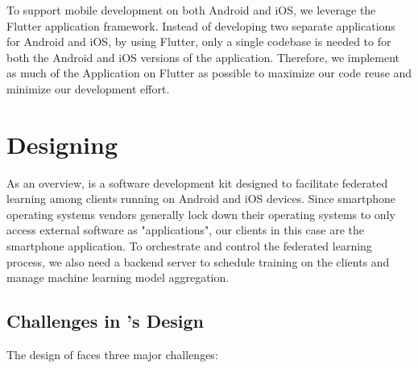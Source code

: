To support mobile development on both Android and iOS,
we leverage the Flutter application framework.
Instead of developing two separate applications for Android and iOS,
by using Flutter,
only a single codebase is needed to for both the Android and iOS versions of
the application.
Therefore, we implement as much of the \fedcampus Application on Flutter as
possible to maximize our code reuse and minimize our development effort.

\section{Designing \fedkit}

As an overview, \fedkit is a software development kit designed to
facilitate federated learning among clients running on Android and iOS devices.
Since smartphone operating systems vendors generally lock down their
operating systems to only access external software as "applications",
our clients in this case are the smartphone application.
To orchestrate and control the federated learning process,
we also need a backend server to schedule training on the clients and
manage machine learning model aggregation.

\subsection{Challenges in \fedkit's Design}

The design of \fedkit faces three major challenges:

